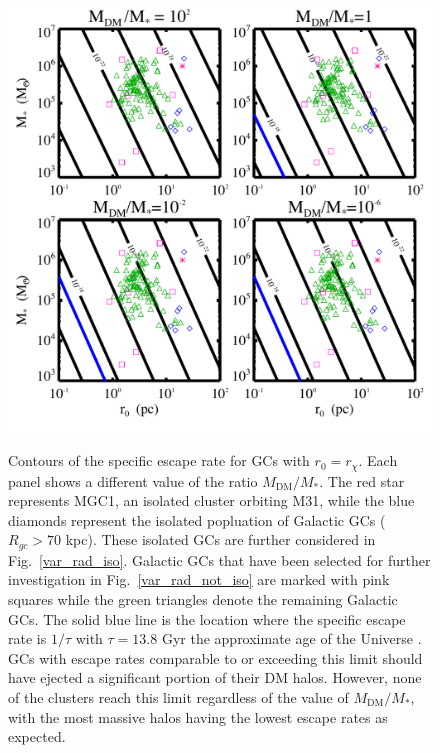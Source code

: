 \documentclass[aps,floatfix,prd,showpacs]{revtex4}
\newcommand{\rx}{r_\chi}
\newcommand{\MDM}{M_{\mathrm{DM}}}
\begin{document}
\begin{figure}[htp]
\centering
\includegraphics[width=12cm, height=12cm]{EscapePlummer}
\caption{Contours of the specific escape rate for GCs with $r_0 = \rx$.  Each panel shows a different value of the ratio $\MDM/M_*$.  The red star represents MGC1, an isolated cluster orbiting M31, while the blue diamonds represent the isolated popluation of Galactic GCs ($R_{gc} > 70$ kpc).  These isolated GCs are further considered in Fig.~\ref{var_rad_iso}.  Galactic GCs that have been selected for further investigation in Fig.~\ref{var_rad_not_iso} are marked with pink squares while the green triangles denote the remaining Galactic GCs.  The solid blue line is the location where the specific escape rate is $1/\tau$ with $\tau = 13.8$ Gyr the approximate age of the Universe \cite{WMAP9,Planck15}.  GCs with escape rates comparable to or exceeding this limit should have ejected a significant portion of their DM halos.  However, none of the clusters reach this limit regardless of the value of $\MDM/M_*$, with the most massive halos having the lowest escape rates as expected.}  
\label{EscapePlummer1}
\end{figure}
\end{document}
